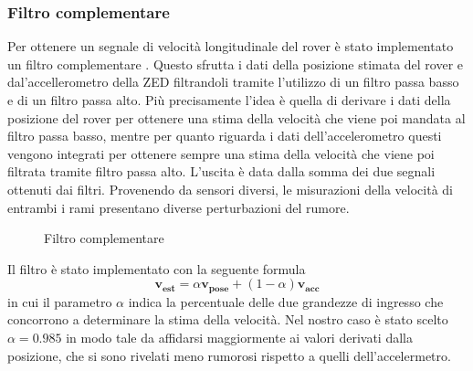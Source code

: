 \subsubsection{Filtro complementare}
Per ottenere un segnale di velocità longitudinale del rover è stato implementato un filtro complementare \cite{Filtrocompelmentare}. Questo sfrutta i dati della posizione stimata del rover e dal'accellerometro della ZED filtrandoli tramite l'utilizzo di un filtro passa basso e di un filtro passa alto. Più precisamente l'idea è quella di derivare i dati della posizione del rover per ottenere una stima della velocità che viene poi mandata al filtro passa basso, mentre per quanto riguarda i dati dell'accelerometro questi vengono integrati per ottenere sempre una stima della velocità che viene poi filtrata tramite filtro passa alto.
L'uscita è data dalla somma dei due segnali ottenuti dai filtri.
Provenendo da sensori diversi, le misurazioni della velocità di entrambi i rami presentano diverse perturbazioni del rumore.
\begin{figure} [H]
    \centering
    
    \caption{Filtro complementare}
    \label{fig:Filtro complementare}
\end{figure} 
\noindent
Il filtro è stato implementato con la seguente formula
\begin{equation}
\boldsymbol{v_{est}}=\alpha \boldsymbol{v_{pose}}+(1-\alpha) \boldsymbol{v_{acc}}
\end{equation} 
in cui il parametro $\alpha$ indica la percentuale delle due grandezze di ingresso che concorrono a determinare la stima della velocità.
Nel nostro caso è stato scelto $\alpha= 0.985$ in modo tale da affidarsi maggiormente ai valori derivati dalla posizione, che si sono rivelati meno rumorosi rispetto a quelli dell'accelermetro.     
